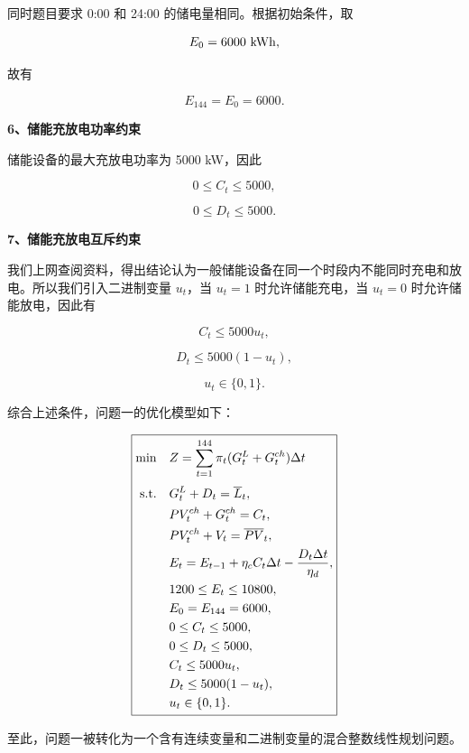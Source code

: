 同时题目要求 0:00 和 24:00 的储电量相同。根据初始条件，取

\[
E_0=6000\ {\rm kWh},
\]

故有

\begin{equation}
E_{144}=E_0=6000.
\end{equation}

\textbf{6、储能充放电功率约束}

储能设备的最大充放电功率为 5000 kW，因此

\[
0\leq C_t\leq5000,
\]

\begin{equation}
0\leq D_t\leq5000.
\end{equation}

\textbf{7、储能充放电互斥约束}

我们上网查阅资料，得出结论认为一般储能设备在同一个时段内不能同时充电和放电。所以我们引入二进制变量 \(u_t\)，当 \(u_t=1\) 时允许储能充电，当 \(u_t=0\) 时允许储能放电，因此有

\[
C_t\leq5000u_t,
\]

\[
D_t\leq5000(1-u_t),
\]

\begin{equation}
u_t\in\{0,1\}.
\end{equation}

综合上述条件，问题一的优化模型如下：

\begin{equation}
\boxed{
\begin{aligned}
\min\quad
&Z=\sum_{t=1}^{144}
\pi_t(G_t^L+G_t^{ch})\Delta t \\[1mm]
{\rm s.t.}\quad
&G_t^L+D_t=\overline L_t,\\
&PV_t^{ch}+G_t^{ch}=C_t,\\
&PV_t^{ch}+V_t=\overline{PV}_t,\\
&E_t=E_{t-1}
+\eta_cC_t\Delta t
-\frac{D_t\Delta t}{\eta_d},\\
&1200\leq E_t\leq10800,\\
&E_0=E_{144}=6000,\\
&0\leq C_t\leq5000,\\
&0\leq D_t\leq5000,\\
&C_t\leq5000u_t,\\
&D_t\leq5000(1-u_t),\\
&u_t\in\{0,1\}.
\end{aligned}}
\end{equation}

至此，问题一被转化为一个含有连续变量和二进制变量的混合整数线性规划问题。

